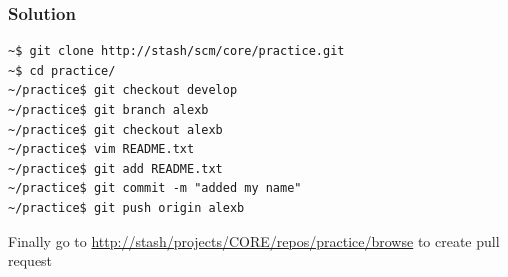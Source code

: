 \documentclass{beamer}
\begin{document}
\begin{frame}[fragile]
    \frametitle{Solution}
    \begin{verbatim}
~$ git clone http://stash/scm/core/practice.git
~$ cd practice/
~/practice$ git checkout develop
~/practice$ git branch alexb
~/practice$ git checkout alexb
~/practice$ vim README.txt
~/practice$ git add README.txt
~/practice$ git commit -m "added my name"
~/practice$ git push origin alexb
    \end{verbatim}
    Finally go to \url{http://stash/projects/CORE/repos/practice/browse} to create pull request
\end{frame}
\end{document}
